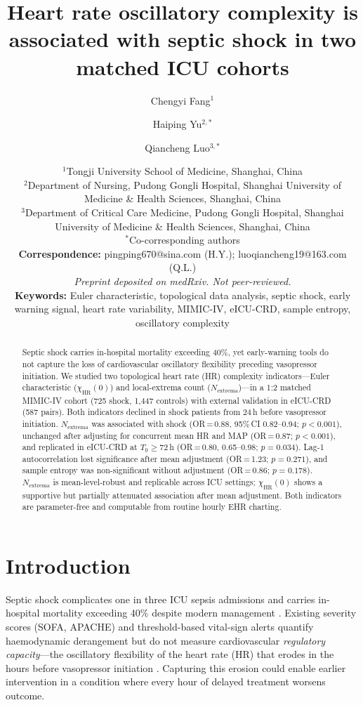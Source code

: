 \documentclass[12pt,a4paper]{article}
\title{\textbf{Heart rate oscillatory complexity is associated with septic
shock in two matched ICU cohorts}}
\author{
  Chengyi Fang$^{1}$ \and
  Haiping Yu$^{2,*}$ \and
  Qiancheng Luo$^{3,*}$
}
\date{
  $^1$Tongji University School of Medicine, Shanghai, China \\
  $^2$Department of Nursing, Pudong Gongli Hospital,
       Shanghai University of Medicine \& Health Sciences, Shanghai, China \\
  $^3$Department of Critical Care Medicine, Pudong Gongli Hospital,
       Shanghai University of Medicine \& Health Sciences, Shanghai, China \\[6pt]
  $^*$Co-corresponding authors \\[6pt]
  \textbf{Correspondence:}
  pingping670@sina.com (H.Y.); luoqiancheng19@163.com (Q.L.) \\[6pt]
  \textit{Preprint deposited on medRxiv. Not peer-reviewed.} \\[4pt]
  \textbf{Keywords:} Euler characteristic, topological data analysis,
  septic shock, early warning signal, heart rate variability,
  MIMIC-IV, eICU-CRD, sample entropy, oscillatory complexity
}
\begin{document}
\maketitle

\begin{abstract}
Septic shock carries in-hospital mortality exceeding 40\%, yet
early-warning tools do not capture the loss of cardiovascular oscillatory
flexibility preceding vasopressor initiation.
We studied two topological heart rate (HR) complexity indicators---Euler
characteristic ($\chi_{\text{HR}}(0)$) and local-extrema count
($N_{\text{extrema}}$)---in a 1:2 matched MIMIC-IV cohort (725 shock,
1,447 controls) with external validation in eICU-CRD (587 pairs).
Both indicators declined in shock patients from 24\,h before vasopressor
initiation.
$N_{\text{extrema}}$ was associated with shock
(OR\,=\,0.88, 95\%\,CI 0.82--0.94; $p<0.001$), unchanged after adjusting
for concurrent mean HR and MAP (OR\,=\,0.87; $p<0.001$), and replicated
in eICU-CRD at $T_0\geq 72$\,h (OR\,=\,0.80, 0.65--0.98; $p=0.034$).
Lag-1 autocorrelation lost significance after mean adjustment
(OR\,=\,1.23; $p=0.271$), and sample entropy was non-significant without
adjustment (OR\,=\,0.86; $p=0.178$).
$N_{\text{extrema}}$ is mean-level-robust and replicable across ICU
settings; $\chi_{\text{HR}}(0)$ shows a supportive but partially
attenuated association after mean adjustment.
Both indicators are parameter-free and computable from routine hourly
EHR charting.
\end{abstract}

\section{Introduction}
\label{sec:intro}

Septic shock complicates one in three ICU sepsis admissions and carries
in-hospital mortality exceeding 40\% despite modern management
\cite{singer2016}.
Existing severity scores (SOFA, APACHE) and threshold-based vital-sign
alerts quantify haemodynamic derangement but do not measure
cardiovascular \emph{regulatory capacity}---the oscillatory flexibility
of the heart rate (HR) that erodes in the hours before vasopressor
initiation \cite{scheffer2009}.
Capturing this erosion could enable earlier intervention in a condition
where every hour of delayed treatment worsens outcome.
\end{document}
